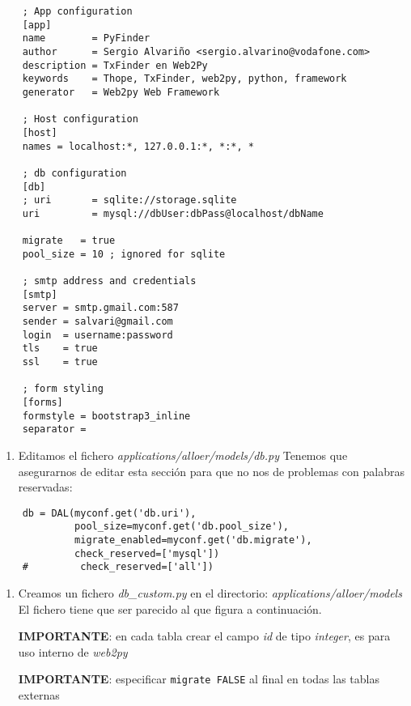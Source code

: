 \documentclass[12pt,spanish,]{article}
\providecommand{\tightlist}{%
  \setlength{\itemsep}{0pt}\setlength{\parskip}{0pt}}
\begin{document}
\begin{verbatim}
    ; App configuration
    [app]
    name        = PyFinder
    author      = Sergio Alvariño <sergio.alvarino@vodafone.com>
    description = TxFinder en Web2Py
    keywords    = Thope, TxFinder, web2py, python, framework
    generator   = Web2py Web Framework

    ; Host configuration
    [host]
    names = localhost:*, 127.0.0.1:*, *:*, *

    ; db configuration
    [db]
    ; uri       = sqlite://storage.sqlite
    uri         = mysql://dbUser:dbPass@localhost/dbName

    migrate   = true
    pool_size = 10 ; ignored for sqlite

    ; smtp address and credentials
    [smtp]
    server = smtp.gmail.com:587
    sender = salvari@gmail.com
    login  = username:password
    tls    = true
    ssl    = true

    ; form styling
    [forms]
    formstyle = bootstrap3_inline
    separator =
\end{verbatim}

\begin{enumerate}
\def\labelenumi{\arabic{enumi}.}
\setcounter{enumi}{2}
\tightlist
\item
  Editamos el fichero \emph{applications/alloer/models/db.py} Tenemos
  que asegurarnos de editar esta sección para que no nos de problemas
  con palabras reservadas:
\end{enumerate}

\begin{verbatim}
    db = DAL(myconf.get('db.uri'),
             pool_size=myconf.get('db.pool_size'),
             migrate_enabled=myconf.get('db.migrate'),
             check_reserved=['mysql'])
    #         check_reserved=['all'])
\end{verbatim}

\begin{enumerate}
\def\labelenumi{\arabic{enumi}.}
\setcounter{enumi}{3}
\item
  Creamos un fichero \emph{db\_custom.py} en el directorio:
  \emph{applications/alloer/models} El fichero tiene que ser parecido al
  que figura a continuación.

  \textbf{IMPORTANTE}: en cada tabla crear el campo \emph{id} de tipo
  \emph{integer}, es para uso interno de \emph{web2py}

  \textbf{IMPORTANTE}: especificar \texttt{migrate\ FALSE} al final en
  todas las tablas externas
\end{enumerate}
\end{document}
